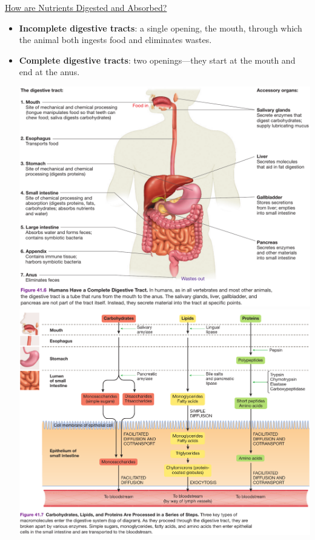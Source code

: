 \documentclass[12pt,letterpaper]{article}
\begin{document}
\hypertarget{41.3}{}
\begin{secbox}{\hyperlink{41}{How are Nutrients Digested and Absorbed?}}{
    \begin{itemize}
        \item \textbf{Incomplete digestive tracts}: a single opening, the mouth, through which the animal both ingests food and eliminates wastes.
        \item \textbf{Complete digestive tracts}: two openings—they start at the mouth and end at the anus.\par 
        \begin{center}
            \includegraphics[scale=0.25]{images/digest.png}\\
            \includegraphics[scale=0.25]{images/digest-2.png}

\end{center}
\end{itemize}}
\end{secbox}
\end{document}
